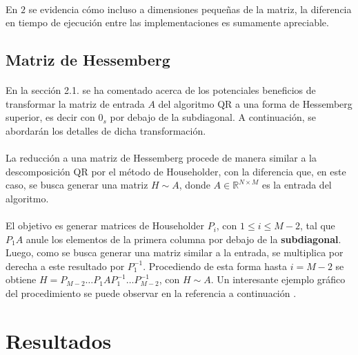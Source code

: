 \documentclass[12pt, twocolumn]{article}
\begin{document}
	\paragraph{} En $2$ se evidencia cómo incluso a dimensiones pequeñas de la matriz, la diferencia en tiempo de ejecución entre las implementaciones es sumamente apreciable.
	
	\subsection{Matriz de Hessemberg}
	
	\paragraph{} En la sección 2.1. se ha comentado acerca de los potenciales beneficios de transformar la matriz de entrada $A$ del algoritmo QR a una forma de Hessemberg superior, es decir con $0_{s}$ por debajo de la subdiagonal. A continuación, se abordarán los detalles de dicha transformación.
	
	\paragraph{} La reducción a una matriz de Hessemberg procede de manera similar a la descomposición QR por el método de Householder, con la diferencia que, en este caso, se busca generar una matriz $H \sim A$, donde $A \in \mathbb{R}^{N\times M}$ es la entrada del algoritmo. 
	
	\paragraph{} El objetivo es generar matrices de Householder $P_{i}$, con $ 1\le i \le M-2$, tal que $P_{1}A$ anule los elementos de la primera columna por debajo de la \textbf{subdiagonal}. Luego, como se busca generar una matriz similar a la entrada, se multiplica por derecha a este resultado por $P_{1}^{-1}$. Procediendo de esta forma hasta $i = M-2$ se obtiene $H = P_{M-2}\dots P_{1}AP_{1}^{-1}\dots P_{M-2}^{-1}$, con $H \sim A$. Un interesante ejemplo gráfico del procedimiento se puede observar en la referencia a continuación \cite{hess}. 
	

	
	\section{Resultados}
	
\end{document}
